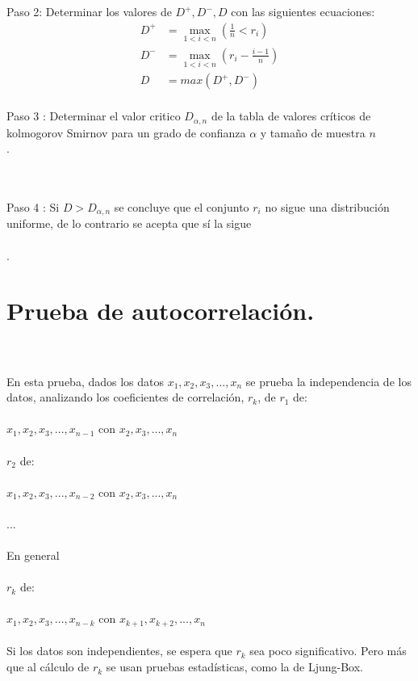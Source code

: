 \documentclass[es-lat]{article}
\begin{document}
Paso 2: Determinar los valores de $D^+, D^-, D$ con las siguientes ecuaciones:
\begin{align*} 
D^+ &= \max_{{1<i<n}}  {(\tfrac{1}{n}<r_{i})}\\ 
D^- &= \max_{{1<i<n}}  {(r_{i}-\frac{i-1}{n})}\\ 
D &= max(D^+,D^-)\\ 
\end{align*}

Paso 3 : Determinar el valor critico $D_{\alpha,n}$ de la tabla de valores críticos de kolmogorov Smirnov para un grado de confianza $\alpha$ y tamaño de muestra $n$\\. 

\\\\Paso 4 : Si  $D>D_{\alpha,n}$ se concluye que el conjunto $r_{i}$ no sigue una distribución uniforme, de lo contrario se acepta que sí la sigue\\\\.








\section{Prueba de autocorrelación.}
\\\\En esta prueba, dados los datos $x_{1}, x_{2}, x_{3},...,x_{n}$ se prueba la independencia de los datos, analizando los coeficientes de correlación, $r_{k}$, de $r_{1}$ de: 
\\\\$x_{1}, x_{2}, x_{3},...,x_{n-1}$ con $x_{2}, x_{3},...,x_{n} $
\\\\$r_{2}$ de: 
\\\\$x_{1}, x_{2}, x_{3},...,x_{n-2}$ con $x_{2}, x_{3},...,x_{n} $
\\\\...
\\\\En general
\\\\$r_{k}$ de: 
\\\\$x_{1}, x_{2}, x_{3},...,x_{n-k}$ con $x_{k+1}, x_{k+2},...,x_{n} $
\\\\Si los datos son independientes, se espera que $r_{k}$ sea poco significativo. Pero más que al cálculo de $r_{k}$ se usan pruebas estadísticas, como la de Ljung-Box.
\end{document}
